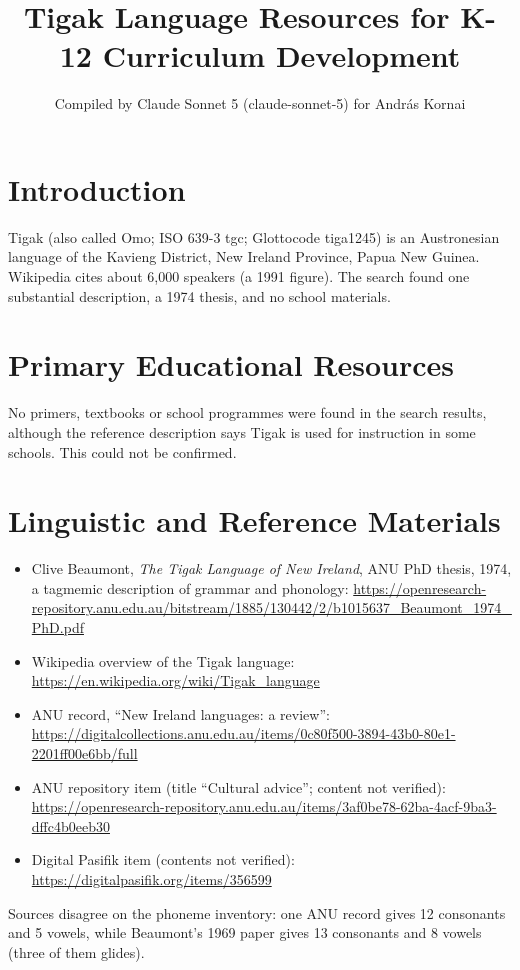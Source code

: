 \documentclass[12pt]{article}
\title{Tigak Language Resources for K-12 Curriculum Development}
\author{Compiled by Claude Sonnet 5 (claude-sonnet-5) for Andr\'as Kornai}
\date{}
\begin{document}
\maketitle

\section{Introduction}
Tigak (also called Omo; ISO 639-3 tgc; Glottocode tiga1245) is an Austronesian language of the Kavieng District, New Ireland Province, Papua New Guinea. Wikipedia cites about 6,000 speakers (a 1991 figure). The search found one substantial description, a 1974 thesis, and no school materials.

\section{Primary Educational Resources}
No primers, textbooks or school programmes were found in the search results, although the reference description says Tigak is used for instruction in some schools. This could not be confirmed.

\section{Linguistic and Reference Materials}
\begin{itemize}
\item Clive Beaumont, \emph{The Tigak Language of New Ireland}, ANU PhD thesis, 1974, a tagmemic description of grammar and phonology: \url{https://openresearch-repository.anu.edu.au/bitstream/1885/130442/2/b1015637_Beaumont_1974_PhD.pdf}
\item Wikipedia overview of the Tigak language: \url{https://en.wikipedia.org/wiki/Tigak_language}
\item ANU record, ``New Ireland languages: a review'': \url{https://digitalcollections.anu.edu.au/items/0c80f500-3894-43b0-80e1-2201ff00e6bb/full}
\item ANU repository item (title ``Cultural advice''; content not verified): \url{https://openresearch-repository.anu.edu.au/items/3af0be78-62ba-4acf-9ba3-dffc4b0eeb30}
\item Digital Pasifik item (contents not verified): \url{https://digitalpasifik.org/items/356599}
\end{itemize}
Sources disagree on the phoneme inventory: one ANU record gives 12 consonants and 5 vowels, while Beaumont's 1969 paper gives 13 consonants and 8 vowels (three of them glides).
\end{document}
